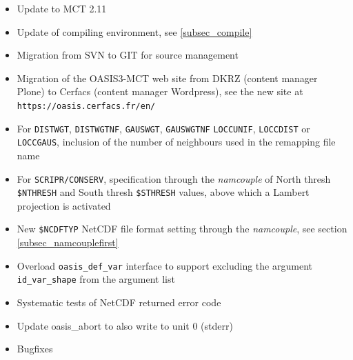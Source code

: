 \begin{itemize}
\item Update to MCT 2.11

\item Update of compiling environment, see \ref{subsec_compile}

\item Migration from SVN to GIT for source management 

\item Migration of the OASIS3-MCT web site from DKRZ (content
  manager Plone) to Cerfacs (content manager Wordpress), see the new
  site at {\tt https://oasis.cerfacs.fr/en/}

\item For {\tt DISTWGT}, {\tt DISTWGTNF}, {\tt GAUSWGT},
  {\tt GAUSWGTNF}  {\tt LOCCUNIF}, {\tt LOCCDIST} or {\tt LOCCGAUS},
  inclusion of the number of neighbours used in the remapping file
  name
    
\item  For {\tt SCRIPR/CONSERV}, specification through the {\it namcouple} of North thresh
  {\tt \$NTHRESH} and South thresh {\tt \$STHRESH} values, above
  which a Lambert projection is activated

\item New {\tt \$NCDFTYP} NetCDF file format setting through the
    {\it namcouple}, see section \ref{subsec_namcouplefirst}

\item Overload {\tt oasis\_def\_var} interface to support excluding the argument {\tt id\_var\_shape} from the argument list

\item Systematic tests of NetCDF returned error code

\item Update oasis\_abort to also write to unit 0 (stderr) 

\item Bugfixes


\end{itemize}

